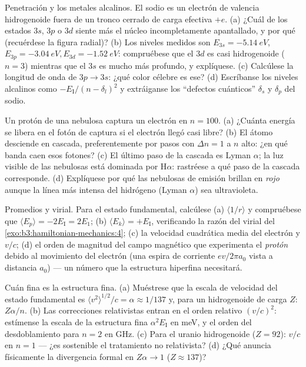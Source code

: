 \begin{exercise}[$\star\star$]\label{exo:b3:hydrogen-atom:8}
Penetración y los metales alcalinos. El sodio es un electrón de valencia
hidrogenoide fuera de un tronco cerrado de carga efectiva $+e$.
(a) ¿Cuál de los estados $3s$, $3p$ o $3d$ siente más el núcleo
incompletamente apantallado, y por qué (recuérdese la figura radial)? (b) Los
niveles medidos son $E_{3s} = \qty{-5.14}{eV}$, $E_{3p} = \qty{-3.04}{eV},
E_{3d} = \qty{-1.52}{eV}$: compruébese que el $3d$ es casi hidrogenoide
($n = 3$) mientras que el $3s$ es mucho más profundo, y explíquese. (c)
Calcúlese la longitud de onda de $3p \to 3s$: ¿qué color célebre es ese? (d)
Escríbanse los niveles alcalinos como $-E_{\text{I}}/(n - \delta_l)^2$ y
extráiganse los ``defectos cuánticos'' $\delta_s$ y $\delta_p$ del sodio.
\end{exercise}

\begin{exercise}[$\star\star$]\label{exo:b3:hydrogen-atom:9}
Un protón de una nebulosa captura un electrón en $n = 100$. (a) ¿Cuánta
energía se libera en el fotón de captura si el electrón llegó casi libre?
(b) El átomo desciende en cascada, preferentemente por pasos con
$\Delta n = 1$ a $n$ alto: ¿en qué banda caen esos fotones? (c) El último
paso de la cascada es Lyman $\alpha$; la luz visible de las nebulosas está
dominada por H$\alpha$: rastréese a qué paso de la cascada corresponde. (d)
Explíquese por qué las nebulosas de emisión brillan en \emph{rojo} aunque la
línea más intensa del hidrógeno (Lyman $\alpha$) sea ultravioleta.
\end{exercise}

\begin{exercise}[$\star\star\star$]\label{exo:b3:hydrogen-atom:10}
Promedios y virial. Para el estado fundamental, calcúlese (a)
$\langle 1/r\rangle$ y compruébese que $\langle E_p\rangle = -2E_{\text{I}}
= 2E_1$; (b) $\langle E_k\rangle = +E_{\text{I}}$, verificando la
razón del virial del \cref{exo:b3:hamiltonian-mechanics:4}; (c) la
velocidad cuadrática media del electrón y $v/c$; (d) el orden de magnitud del campo magnético que
experimenta el \emph{protón} debido al movimiento del electrón (una espira
de corriente $ev/2\pi a_0$ vista a distancia $a_0$) --- un número que la
estructura hiperfina necesitará.
\end{exercise}

\begin{exercise}[$\star\star\star$]\label{exo:b3:hydrogen-atom:11}
Cuán fina es la estructura fina. (a) Muéstrese que la escala de velocidad
del estado fundamental es $\langle v^2\rangle^{1/2}/c = \alpha \approx 1/137$
y, para un hidrogenoide de carga $Z$: $Z\alpha/n$. (b) Las correcciones
relativistas entran en el orden relativo $(v/c)^2$: estímense la escala de la
estructura fina $\alpha^2E_{\text{I}}$ en meV, y el orden del
desdoblamiento para $n = 2$ en GHz. (c) Para el uranio hidrogenoide
($Z = 92$): $v/c$ en $n = 1$ --- ¿es sostenible el tratamiento no
relativista? (d) ¿Qué anuncia físicamente la divergencia formal en
$Z\alpha \to 1$ ($Z \approx 137$)?
\end{exercise}

